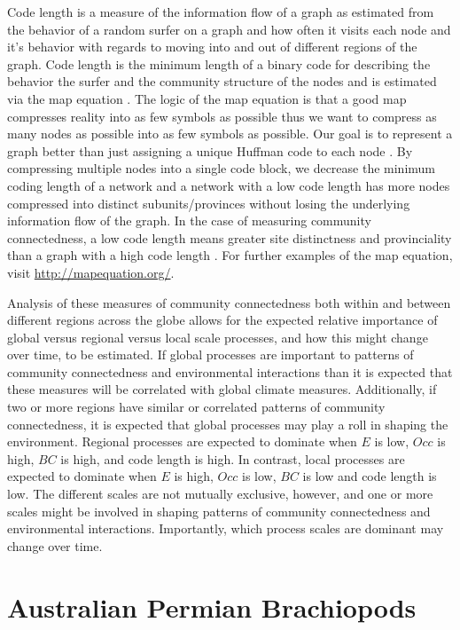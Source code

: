 \documentclass[12pt,letterpaper]{article}
\begin{document}
Code length is a measure of the information flow \citep{Shannon1948} of a graph as estimated from the behavior of a random surfer \citep{Brin1998} on a graph and how often it visits each node and it's behavior with regards to moving into and out of different regions of the graph. Code length is the minimum length of a binary code for describing the behavior the surfer and the community structure of the nodes and is estimated via the map equation \citep{Rosvall2008,Rosvall2009a}. The logic of the map equation is that a good map compresses reality into as few symbols as possible thus we want to compress as many nodes as possible into as few symbols as possible. Our goal is to represent a graph better than just assigning a unique Huffman code to each node \citep{Huffman1952,Rosvall2008}. By compressing multiple nodes into a single code block, we decrease the minimum coding length of a network and a network with a low code length has more nodes compressed into distinct subunits/provinces without losing the underlying information flow of the graph. In the case of measuring community connectedness, a low code length means greater site distinctness and provinciality than a graph with a high code length \citep{Sidor2013}. For further examples of the map equation, visit \url{http://mapequation.org/}.

Analysis of these measures of community connectedness both within and between different regions across the globe allows for the expected relative importance of global versus regional versus local scale processes, and how this might change over time, to be estimated. If global processes are important to patterns of community connectedness and environmental interactions than it is expected that these measures will be correlated with global climate measures. Additionally, if two or more regions have similar or correlated patterns of community connectedness, it is expected that global processes may play a roll in shaping the environment. Regional processes are expected to dominate when \(E\) is low, \(Occ\) is high, \(BC\) is high, and code length is high. In contrast, local processes are expected to dominate when \(E\) is high, \(Occ\) is low, \(BC\) is low and code length is low. The different scales are not mutually exclusive, however, and one or more scales might be involved in shaping patterns of community connectedness and environmental interactions. Importantly, which process scales are dominant may change over time.


\section{Australian Permian Brachiopods} \label{sec:brac}
\end{document}
